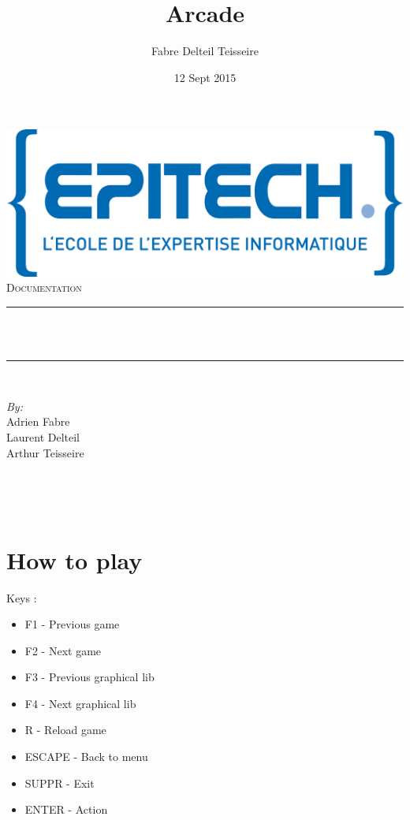 \documentclass[12pt]{article}
\title{Arcade}								%
\author{Fabre Delteil Teisseire}								%
\date{12 Sept 2015}											%
\makeatletter
\let\thetitle\@title
\makeatother
\begin{document}
\begin{titlepage}
	\centering
    \vspace*{0.5 cm}
    \includegraphics[scale = 0.75]{logo-epitech.png}\\[1.0 cm]	%
    \textsc{\LARGE Documentation}\\[2.0 cm]	%
	\rule{\linewidth}{0.2 mm} \\[0.4 cm]
	{ \huge \bfseries \thetitle}\\
	\rule{\linewidth}{0.2 mm} \\[1.5 cm]
	

\vspace{6cm}
	\begin{minipage}{0.7\textwidth}
		\begin{flushleft} \large
			\emph{By:}\\
			Adrien Fabre\\
            Laurent Delteil\\
            Arthur Teisseire\\
			\end{flushleft}
			\end{minipage}~
			\begin{minipage}{0.4\textwidth}
			\begin{flushright} \large

		\end{flushright}
        
	\end{minipage}\\[2 cm]
	
\end{titlepage}


\section{How to play}
Keys :
\begin{itemize}
\item F1 - Previous game
\item F2 - Next game
\item F3 - Previous graphical lib
\item F4 - Next graphical lib
\item R - Reload game
\item ESCAPE - Back to menu
\item SUPPR - Exit
\item ENTER - Action
\end{itemize}
\end{document}
